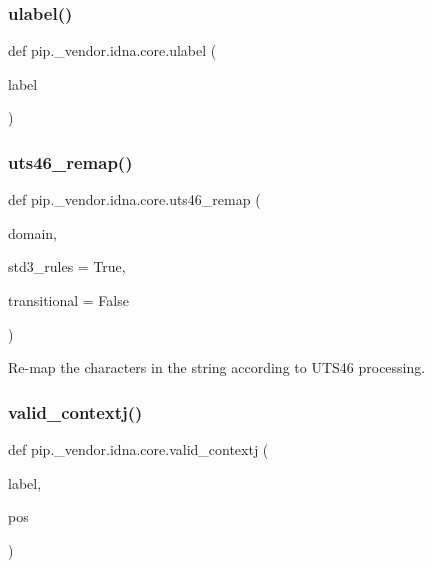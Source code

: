 \subsubsection{\texorpdfstring{ulabel()}{ulabel()}}
{\footnotesize\ttfamily def pip.\+\_\+vendor.\+idna.\+core.\+ulabel (\begin{DoxyParamCaption}\item[{}]{label }\end{DoxyParamCaption})}

\mbox{\label{namespacepip_1_1__vendor_1_1idna_1_1core_a2d90033244fa673825a46b11909a635d}} 
\subsubsection{\texorpdfstring{uts46\+\_\+remap()}{uts46\_remap()}}
{\footnotesize\ttfamily def pip.\+\_\+vendor.\+idna.\+core.\+uts46\+\_\+remap (\begin{DoxyParamCaption}\item[{}]{domain,  }\item[{}]{std3\+\_\+rules = {\ttfamily True},  }\item[{}]{transitional = {\ttfamily False} }\end{DoxyParamCaption})}

\begin{DoxyVerb}Re-map the characters in the string according to UTS46 processing.\end{DoxyVerb}
 \mbox{\label{namespacepip_1_1__vendor_1_1idna_1_1core_ae0ccbd5b53689c3986cd22100cbc8e99}} 
\subsubsection{\texorpdfstring{valid\+\_\+contextj()}{valid\_contextj()}}
{\footnotesize\ttfamily def pip.\+\_\+vendor.\+idna.\+core.\+valid\+\_\+contextj (\begin{DoxyParamCaption}\item[{}]{label,  }\item[{}]{pos }\end{DoxyParamCaption})}

